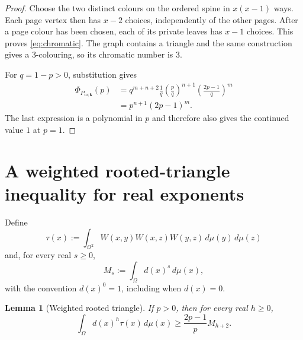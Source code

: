 \documentclass[11pt]{article}
\newtheorem{lemma}[theorem]{Lemma}
\newcommand{\dd}{\,d}
\begin{document}
\begin{proof}
Choose the two distinct colours on the ordered spine in $x(x-1)$
ways.  Each page vertex then has $x-2$ choices, independently of the
other pages.  After a page colour has been chosen, each of its private
leaves has $x-1$ choices.  This proves \eqref{eq:chromatic}.  The graph
contains a triangle and the same construction gives a $3$-colouring,
so its chromatic number is $3$.

For $q=1-p>0$, substitution gives
\begin{align*}
 \Phi_{P_{m;\mathbf{k}}}(p)
 &=q^{m+n+2}\frac1q
   \left(\frac pq\right)^{n+1}
   \left(\frac{2p-1}{q}\right)^m
 \\
 &=p^{n+1}(2p-1)^m.
\end{align*}
The last expression is a polynomial in $p$ and therefore also gives
the continued value $1$ at $p=1$.
\end{proof}


\section{A weighted rooted-triangle inequality for real exponents}

Define
\[
 \tau(x):=\int_{\Omega^2}
 W(x,y)W(x,z)W(y,z)\dd\mu(y)\dd\mu(z)
\]
and, for every real $s\geq0$,
\[
 M_s:=\int_\Omega d(x)^s\dd\mu(x),
\]
with the convention $d(x)^0=1$, including when $d(x)=0$.

\begin{lemma}[Weighted rooted triangle]\label{lem:weighted-triangle}
If $p>0$, then for every real $h\geq0$,
\begin{equation}
 \int_\Omega d(x)^h\tau(x)\dd\mu(x)
 \geq
 \frac{2p-1}{p}M_{h+2}.
 \label{eq:weighted-triangle}
\end{equation}
\end{lemma}
\end{document}
